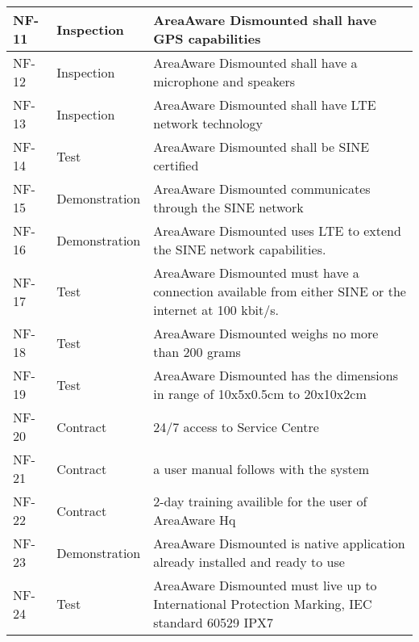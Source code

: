 \begin{longtable}{| p{2.4cm}  | p{2.6cm} | p{6.6cm} |  }
	NF-11	& Inspection	& AreaAware Dismounted shall have GPS capabilities \\ \hline
	NF-12	& Inspection	& AreaAware Dismounted shall have a microphone and speakers \\ \hline
	NF-13	& Inspection	& AreaAware Dismounted shall have LTE network technology \\ \hline
	NF-14	& Test			& AreaAware Dismounted shall be SINE certified \\ \hline
	NF-15	& Demonstration	& AreaAware Dismounted communicates through the SINE network \\ \hline
	NF-16	& Demonstration	& AreaAware Dismounted uses LTE to extend the SINE network capabilities. \\ \hline
	NF-17	& Test			& AreaAware Dismounted must have a connection available from either SINE or the internet at 100 kbit/s. \\ \hline
	NF-18	& Test			& AreaAware Dismounted  weighs no more than 200 grams\\ \hline
	NF-19	& Test			& AreaAware Dismounted  has the dimensions in range of 10x5x0.5cm to 20x10x2cm\\ \hline
	NF-20	& Contract		& 24/7 access to Service Centre\\ \hline
	NF-21	& Contract		& a user manual follows with the system\\ \hline
	NF-22	& Contract		& 2-day training availible for the user of AreaAware Hq \\ \hline
	NF-23	& Demonstration	& AreaAware Dismounted is native application already installed and ready to use \\ \hline
	NF-24  & Test 			& AreaAware Dismounted must live up to International Protection Marking, IEC standard 60529 IPX7 \\  \hline
\end{longtable}